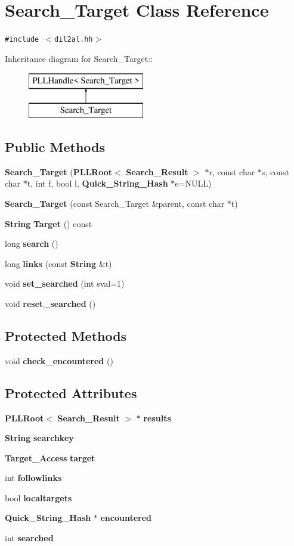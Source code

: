\section{Search\_\-Target  Class Reference}
\label{classSearch__Target}
{\tt \#include $<$dil2al.hh$>$}

Inheritance diagram for Search\_\-Target::\begin{figure}[H]
\begin{center}
\leavevmode
\includegraphics[height=2cm]{classSearch__Target}
\end{center}
\end{figure}
\subsection*{Public Methods}
\begin{CompactItemize}
\item 
{\bf Search\_\-Target} ({\bf PLLRoot}$<$ {\bf Search\_\-Result} $>$ $\ast$r, const char $\ast$s, const char $\ast$t, int f, bool l, {\bf Quick\_\-String\_\-Hash} $\ast$e=NULL)
\item 
{\bf Search\_\-Target} (const Search\_\-Target \&parent, const char $\ast$t)
\item 
{\bf String} {\bf Target} () const
\item 
long {\bf search} ()
\item 
long {\bf links} (const {\bf String} \&t)
\item 
void {\bf set\_\-searched} (int sval=1)
\item 
void {\bf reset\_\-searched} ()
\end{CompactItemize}
\subsection*{Protected Methods}
\begin{CompactItemize}
\item 
void {\bf check\_\-encountered} ()
\end{CompactItemize}
\subsection*{Protected Attributes}
\begin{CompactItemize}
\item 
{\bf PLLRoot}$<$ {\bf Search\_\-Result} $>$ $\ast$ {\bf results}
\item 
{\bf String} {\bf searchkey}
\item 
{\bf Target\_\-Access} {\bf target}
\item 
int {\bf followlinks}
\item 
bool {\bf localtargets}
\item 
{\bf Quick\_\-String\_\-Hash} $\ast$ {\bf encountered}
\item 
int {\bf searched}
\end{CompactItemize}



